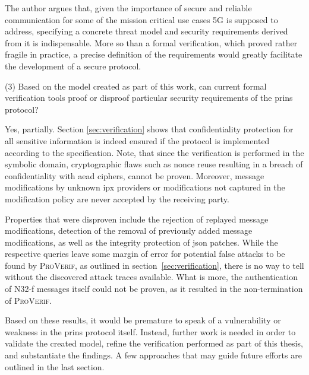 The author argues that, given the importance of secure and reliable communication for some of the mission critical use cases 5G is supposed to address, specifying a concrete threat model and security requirements derived from it is indispensable.
More so than a formal verification, which proved rather fragile in practice, a precise definition of the requirements would greatly facilitate the development of a secure protocol.\bigskip

\noindent
(3) Based on the model created as part of this work, can current formal verification tools proof or disproof particular security requirements of the \gls{prins} protocol?

Yes, partially.
Section \ref{sec:verification} shows that confidentiality protection for all sensitive information is indeed ensured if the protocol is implemented according to the specification.
Note, that since the verification is performed in the symbolic domain, cryptographic flaws such as nonce reuse resulting in a breach of confidentiality with \gls{aead} ciphers, cannot be proven.
Moreover, message modifications by unknown \gls{ipx} providers or modifications not captured in the modification policy are never accepted by the receiving party.

Properties that were disproven include the rejection of replayed message modifications, detection of the removal of previously added message modifications, as well as the integrity protection of \gls{json} patches.
While the respective queries leave some margin of error for potential false attacks to be found by \textsc{ProVerif}, as outlined in section~\ref{sec:verification}, there is no way to tell without the discovered attack traces available.
What is more, the authentication of N32-f messages itself could not be proven, as it resulted in the non-termination of \textsc{ProVerif}.

Based on these results, it would be premature to speak of a vulnerability or weakness in the \gls{prins} protocol itself.
Instead, further work is needed in order to validate the created model, refine the verification performed as part of this thesis, and substantiate the findings.
A few approaches that may guide future efforts are outlined in the last section.

